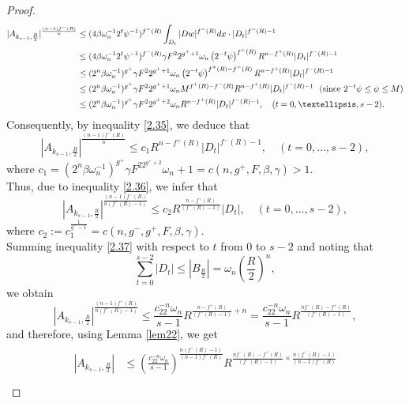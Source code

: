 \documentclass[10pt,a4paper]{amsart}
\begin{document}
\begin{proof}
\begin{align}\label{2.35}
\begin{split}
|A_{k_{s-1}, \frac{R}{2}}|^{\frac{(n-1)f^-(R)}{n}} &\leq (4\beta\omega_n^{-1}2^t\psi^{-1})^{f^-(R)} \int_{D_t} |Dw|^{f^-(R)} {\rm d}x \cdot |D_t|^{f^-(R) - 1}\\
&\leq (4\beta\omega_n^{-1}2^t\psi^{-1})^{f^-(R)}\gamma F^22^{g^++1}\omega_n\left(2^{-t}\psi\right)^{f^+(R)} R^{n-f^+(R)}|D_t|^{f^-(R) - 1}\\
&\leq (2^n\beta\omega_n^{-1})^{g^+}\gamma F^22^{g^++1}\omega_n\left(2^{-t}\psi\right)^{f^+(R)-f^-(R)} R^{n-f^+(R)}|D_t|^{f^-(R) - 1}\\
&\leq (2^n\beta\omega_n^{-1})^{g^+}\gamma F^22^{g^++1}\omega_n M^{f^+(R)-f^-(R)} R^{n-f^+(R)}|D_t|^{f^-(R) - 1}\ \ (\text{since}\ 2^{-t}\psi \leq \psi \leq M )\\
&\leq (2^n\beta\omega_n^{-1})^{g^+}\gamma F^22^{g^++2}\omega_n  R^{n-f^+(R)}|D_t|^{f^-(R) - 1},\quad (t = 0, \ldots, s - 2).
\end{split}
\end{align}
Consequently, by inequality \eqref{2.35}, we deduce that
\begin{equation}\label{2.36}
|A_{k_{s-1}, \frac{R}{2}}|^{\frac{(n-1)f^-(R)}{n}} \leq c_1 R^{n - f^+(R)} |D_t|^{f^-(R) - 1}, \quad (t = 0, \ldots, s - 2),
\end{equation}
where \(c_1 = (2^n\beta\omega_n^{-1})^{g^+}\gamma F^22^{g^++2}\omega_n + 1 = c(n,g^+,F,\beta,\gamma) > 1\).\\
Thus, due to inequality \eqref{2.36}, we infer that
\begin{equation}\label{2.37}
|A_{k_{s-1}, \frac{R}{2}}|^{\frac{(n-1)f^-(R)}{n(f^-(R) - 1)}} \leq c_2R^{\frac{n-f^+(R)}{(f^-(R) - 1)}} |D_t|, \quad (t = 0, \ldots, s - 2),
\end{equation}
where \(c_2:=  c_1^{\frac{1}{g^--1}}=c(n,g^-,g^+,F,\beta,\gamma)\).\\
Summing inequality \eqref{2.37} with respect to \(t\) from $0$ to \(s - 2\) and noting that
\[
\sum_{t=0}^{s-2} |D_t|\leq |B_{\frac{R}{2}}| = \omega_n \left(\frac{R}{2}\right)^n,
\]
we obtain
\[
|A_{k_{s-1}, \frac{R}{2}}|^{\frac{(n-1)f^-(R)}{n(f^-(R) - 1)}} \leq \frac{c_22^{-n}\omega_n}{s  - 1} R^{\frac{n-f^+(R)}{(f^-(R) - 1)}+n}=\frac{c_22^{-n}\omega_n}{s - 1} R^{\frac{nf^-(R)-f^+(R)}{(f^-(R) - 1)}},
\]
and therefore, using Lemma \ref{lem22}, we get
\begin{align}\label{2.38}
\begin{split}
|A_{k_{s-1}, \frac{R}{2}}| &\leq \left(\frac{c_22^{-n}\omega_n}{s - 1}\right)^{\frac{n(f^-(R) - 1)}{(n-1)f^-(R)}} R^{\frac{nf^-(R)-f^+(R)}{(f^-(R) - 1)}\times\frac{n(f^-(R) - 1)}{(n-1)f^-(R)}}\\

\end{split}
\end{align}
\end{proof}
\end{document}

